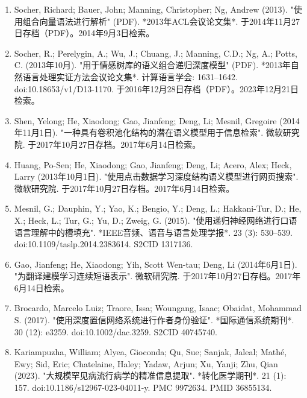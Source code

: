\begin{enumerate}
\item Socher, Richard; Bauer, John; Manning, Christopher; Ng, Andrew (2013). "使用组合向量语法进行解析" (PDF). *2013年ACL会议论文集*. 于2014年11月27日存档（PDF）。2014年9月3日检索。
\item Socher, R.; Perelygin, A.; Wu, J.; Chuang, J.; Manning, C.D.; Ng, A.; Potts, C. (2013年10月). "用于情感树库的语义组合递归深度模型" (PDF). *2013年自然语言处理实证方法会议论文集*. 计算语言学会: 1631–1642. doi:10.18653/v1/D13-1170. 于2016年12月28日存档（PDF）。2023年12月21日检索。
\item Shen, Yelong; He, Xiaodong; Gao, Jianfeng; Deng, Li; Mesnil, Gregoire (2014年11月1日). "一种具有卷积池化结构的潜在语义模型用于信息检索". 微软研究院. 于2017年10月27日存档。2017年6月14日检索。
\item Huang, Po-Sen; He, Xiaodong; Gao, Jianfeng; Deng, Li; Acero, Alex; Heck, Larry (2013年10月1日). "使用点击数据学习深度结构语义模型进行网页搜索". 微软研究院. 于2017年10月27日存档。2017年6月14日检索。
\item Mesnil, G.; Dauphin, Y.; Yao, K.; Bengio, Y.; Deng, L.; Hakkani-Tur, D.; He, X.; Heck, L.; Tur, G.; Yu, D.; Zweig, G. (2015). "使用递归神经网络进行口语语言理解中的槽填充". *IEEE音频、语音与语言处理学报*. 23 (3): 530–539. doi:10.1109/taslp.2014.2383614. S2CID 1317136.
\item Gao, Jianfeng; He, Xiaodong; Yih, Scott Wen-tau; Deng, Li (2014年6月1日). "为翻译建模学习连续短语表示". 微软研究院. 于2017年10月27日存档。2017年6月14日检索。
\item Brocardo, Marcelo Luiz; Traore, Issa; Woungang, Isaac; Obaidat, Mohammad S. (2017). "使用深度置信网络系统进行作者身份验证". *国际通信系统期刊*. 30 (12): e3259. doi:10.1002/dac.3259. S2CID 40745740.
\item Kariampuzha, William; Alyea, Gioconda; Qu, Sue; Sanjak, Jaleal; Mathé, Ewy; Sid, Eric; Chatelaine, Haley; Yadaw, Arjun; Xu, Yanji; Zhu, Qian (2023). "大规模罕见病流行病学的精准信息提取". *转化医学期刊*. 21 (1): 157. doi:10.1186/s12967-023-04011-y. PMC 9972634. PMID 36855134.
\end{enumerate}
